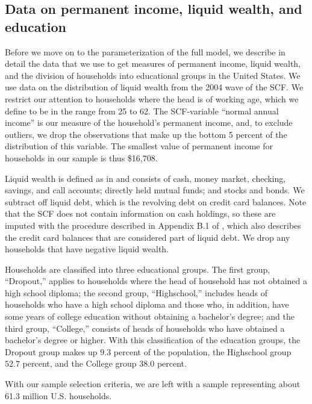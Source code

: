 \documentclass[\econtexRoot/HAFiscal]{subfiles}
\begin{document}
 

\hypertarget{data-on-permanent-income-liquid-wealth-and-education}{}\par\subsection{Data on permanent income, liquid wealth, and education}
\notinsubfile{\label{sec:SCFdata}}

Before we move on to the parameterization of the full model, we describe in detail the data that we use to get measures of permanent income, liquid wealth, and the division of households into educational groups in the United States. We use data on the distribution of liquid wealth from the 2004 wave of the SCF. We restrict our attention to households where the head is of working age, which we define to be in the range from 25 to 62. The SCF-variable ``normal annual income'' is our measure of the household's permanent income, and, to exclude outliers, we drop the observations that make up the bottom 5 percent of the distribution of this variable. The smallest value of permanent income for households in our sample is thus \$16,708. 

Liquid wealth is defined as in \cite{kaplan2014model} and consists of cash, money market, checking, savings, and call accounts; directly held mutual funds; and stocks and bonds. We subtract off liquid debt, which is the revolving debt on credit card balances. Note that the SCF does not contain information on cash holdings, so these are imputed with the procedure described in Appendix B.1 of \cite{kaplan2014model}, which also describes the credit card balances that are considered part of liquid debt. We drop any households that have negative liquid wealth. 

Households are classified into three educational groups. The first group, ``Dropout,'' applies to households where the head of household has not obtained a high school diploma; the second group, ``Highschool,'' includes heads of households who have a high school diploma and those who, in addition, have some years of college education without obtaining a bachelor's degree; and the third group, ``College,'' consists of heads of households who have obtained a bachelor's degree or higher. With this classification of the education groups, the Dropout group makes up $9.3$ percent of the population, the Highschool group $52.7$ percent, and the College group $38.0$ percent. 

With our sample selection criteria, we are left with a sample representing about 61.3 million U.S. households.
\end{document}
